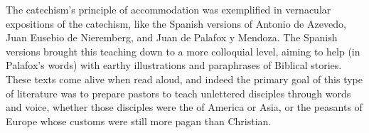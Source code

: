 The catechism's principle of accommodation was exemplified in vernacular
expositions of the catechism, like the Spanish versions of Antonio de Azevedo,
Juan Eusebio de Nieremberg, and Juan de Palafox y Mendoza.%
    \Autocites{Azevedo:Catecismo}{Nieremberg:PracticaCatecismo}{Palafox:Bocados}
The Spanish versions brought this teaching down to a more colloquial level,
aiming to help  (in Palafox's words) with
earthy illustrations and paraphrases of Biblical stories.
These texts come alive when read aloud, and indeed the primary goal of this type
of literature was to prepare pastors to teach unlettered disciples through words
and voice, whether those disciples were the  of America or Asia,
or the peasants of Europe whose customs were still more pagan than Christian.%
    \Autocite
    [On Europe as a mission front after Trent, see][60--63]
    {Kamen:EarlyModernSociety}

